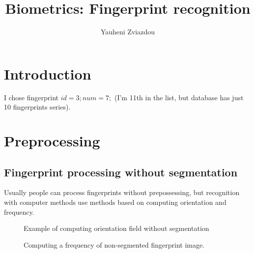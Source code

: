 \documentclass{article}
\title{Biometrics: Fingerprint recognition}
\author{Yauheni Zviazdou}
\begin{document}
\maketitle


\section{Introduction}

I chose fingerprint \(id = 3; num = 7;\) (I'm 11th in the list, but database has just 10 fingerprints series).

\section{Preprocessing}

\subsection{Fingerprint processing without segmentation}

Usually people can process fingerprints without prepossessing, but recognition with computer methods use methods based on computing orientation and frequency.

\begin{figure}[htbp] 
  \centering
  \def\svgscale{0.5}
  
  \caption{Example of computing orientation field without segmentation}
  \label{NoSegmentationOrientation}
\end{figure}

\begin{figure}[htbp]
  \centering
  \def\svgscale{0.5}
  
  \caption{Computing a frequency of non-segmented fingerprint image.}
\end{figure}

\newpage
\end{document}
